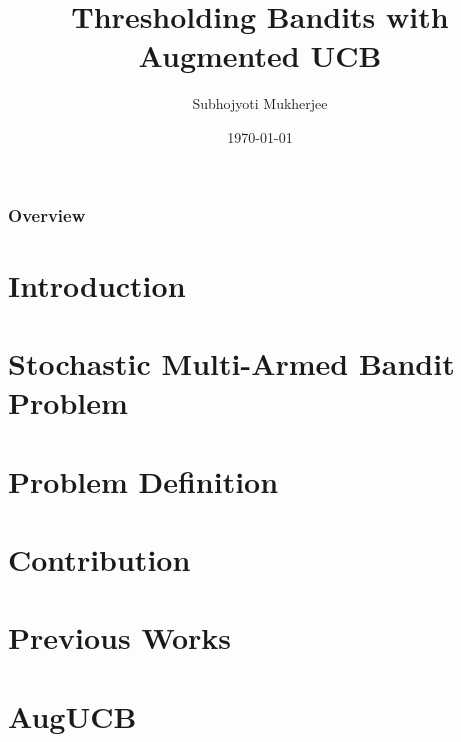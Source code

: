 \documentclass{beamer}
\title[Thresholding Bandits with Augmented UCB]{Thresholding Bandits with Augmented UCB} %
\author{Subhojyoti Mukherjee} %
\institute[IIT Madras] %
{
IIT Madras \\ %
\medskip
}
\date{\today} %
\begin{document}
\nocite{*}
\begin{frame}
\titlepage %
\end{frame}

\begin{frame}
\frametitle{Overview} %
\tableofcontents %
\end{frame}



\section{Introduction}


\section{Stochastic Multi-Armed Bandit Problem}


\section{Problem Definition}


\section{Contribution}


\section{Previous Works}


\section{AugUCB}

\end{document}
